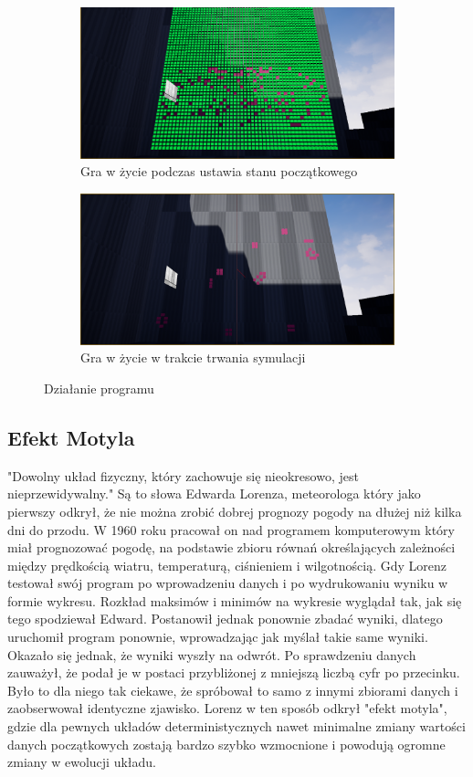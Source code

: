 \documentclass[a4paper,12pt,reqno]{article}
\begin{document}
\begin{figure}[H]%
	\centering
	\begin{subfigure}{.5\textwidth}
		\centering
		\includegraphics[width=0.8\linewidth]{graphics/gameoflife/GOLInUE_1.png}
		\caption{Gra w życie podczas ustawia stanu początkowego}	
		\label{ref:subref_a}
	\end{subfigure}%
	\begin{subfigure}{.5\textwidth}
		\centering
		\includegraphics[width=0.8\linewidth]{graphics/gameoflife/GOLInUE_2.png}
		\caption{Gra w życie w trakcie trwania symulacji}
		\label{ref:subref_b}
	\end{subfigure}%
	

\caption{Działanie programu}
\label{ref:ref}
\end{figure}

\subsection{Efekt Motyla}

"Dowolny układ fizyczny, który zachowuje się nieokresowo, jest nieprzewidywalny." Są to słowa Edwarda Lorenza, meteorologa który jako pierwszy odkrył, że nie można zrobić dobrej prognozy pogody na dłużej niż kilka dni do przodu. W 1960 roku pracował on nad programem komputerowym który miał prognozować pogodę, na podstawie zbioru równań określających zależności między prędkością wiatru, temperaturą, ciśnieniem i wilgotnością. Gdy Lorenz testował swój program po wprowadzeniu danych i po wydrukowaniu wyniku w formie wykresu. Rozkład maksimów i minimów na wykresie wyglądał tak, jak się tego spodziewał Edward. Postanowił jednak ponownie zbadać wyniki, dlatego uruchomił program ponownie, wprowadzając jak myślał takie same wyniki. Okazało się jednak, że wyniki wyszły na odwrót. Po sprawdzeniu danych zauważył, że podał je w postaci przybliżonej z mniejszą liczbą cyfr po przecinku. Było to dla niego tak ciekawe, że spróbował to samo z innymi zbiorami danych i zaobserwował identyczne zjawisko. Lorenz w ten sposób odkrył "efekt motyla", gdzie dla pewnych układów deterministycznych nawet minimalne zmiany wartości danych początkowych zostają bardzo szybko wzmocnione i powodują ogromne zmiany w ewolucji układu\cite{burze_motyle}.
\end{document}
